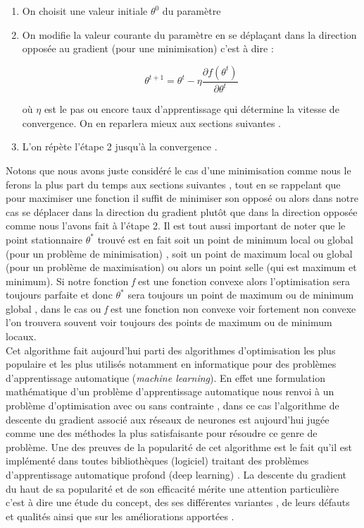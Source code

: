 \documentclass[12pt,a4paper]{article}
\begin{document}
\begin{enumerate}
\item On choisit une valeur initiale $\theta^{0}$ du paramètre  \\	
\item On modifie la valeur courante du paramètre en se déplaçant dans la direction opposée au gradient (pour une minimisation) c'est à dire : 
	\vspace{0.2in}
	\begin{large}
	\begin{equation}
	\theta^{t+1}=\theta^{t}-\eta \frac{\partial{f(\theta^{t})}}{\partial{\theta^{t}}}
	\end{equation}
	\end{large}
	
où $\eta$ est le pas ou encore taux d'apprentissage qui détermine la vitesse de convergence. On en reparlera mieux aux sections suivantes . \\

\item L'on répète l'étape 2 jusqu'à la convergence . \\
\end{enumerate}
Notons que nous avons juste considéré le cas d'une minimisation comme nous le ferons la plus part du temps aux sections suivantes , tout en se rappelant que pour maximiser une fonction il suffit de minimiser son opposé ou alors dans notre cas se déplacer dans la direction du gradient plutôt que dans la direction opposée comme nous l'avons fait à l'étape 2. Il est tout aussi important de noter que le point stationnaire $\theta^{*}$ trouvé est en fait soit un point de minimum local ou global (pour un problème de minimisation) , soit un point de maximum local ou global (pour un problème de maximisation) ou alors un point selle (qui est maximum et minimum). Si notre fonction \textit{f} est une fonction convexe alors l'optimisation sera toujours parfaite et donc $\theta^{*}$ sera toujours un point de maximum ou de minimum global , dans le cas ou \textit{f} est une fonction non convexe voir fortement non convexe l'on trouvera souvent voir toujours des points de maximum ou de minimum locaux. \\


Cet algorithme fait aujourd'hui parti des algorithmes d'optimisation les plus populaire et les plus utilisés notamment en informatique pour des problèmes d'apprentissage automatique (\textit{machine learning}). En effet une formulation mathématique d'un problème d'apprentissage automatique nous renvoi à un problème d'optimisation avec ou sans contrainte , dans ce cas l'algorithme de descente du gradient associé aux réseaux de neurones est aujourd'hui jugée comme une des méthodes la plus satisfaisante pour résoudre ce genre de problème. Une des preuves de la popularité de cet algorithme est le fait qu'il est implémenté dans toutes bibliothèques (logiciel) traitant des problèmes d'apprentissage automatique profond (deep learning) . La descente du gradient du haut de sa popularité et de son efficacité mérite une attention particulière c'est à dire une étude du concept, des ses différentes variantes , de leurs défauts et qualités ainsi que sur les améliorations apportées .
\end{document}
